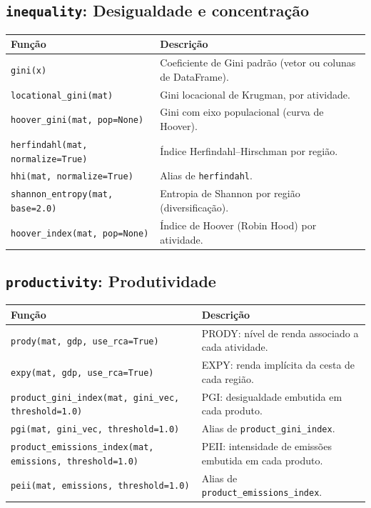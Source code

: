 \subsection{\texttt{inequality}: Desigualdade e concentra\c{c}\~{a}o}
\begin{longtable}{>{\raggedright\arraybackslash}p{9.2cm} >{\raggedright\arraybackslash}p{7.0cm}}
\toprule
\textbf{Fun\c{c}\~{a}o} & \textbf{Descri\c{c}\~{a}o} \\
\midrule\endhead
\texttt{\footnotesize gini(x)} & {\small Coeficiente de Gini padr\~{a}o (vetor ou colunas de DataFrame).} \\[2pt]
\texttt{\footnotesize locational\_gini(mat)} & {\small Gini locacional de Krugman, por atividade.} \\[2pt]
\texttt{\footnotesize hoover\_gini(mat, pop=None)} & {\small Gini com eixo populacional (curva de Hoover).} \\[2pt]
\texttt{\footnotesize herfindahl(mat, normalize=True)} & {\small \'{I}ndice Herfindahl--Hirschman por regi\~{a}o.} \\[2pt]
\texttt{\footnotesize hhi(mat, normalize=True)} & {\small Alias de \texttt{herfindahl}.} \\[2pt]
\texttt{\footnotesize shannon\_entropy(mat, base=2.0)} & {\small Entropia de Shannon por regi\~{a}o (diversifica\c{c}\~{a}o).} \\[2pt]
\texttt{\footnotesize hoover\_index(mat, pop=None)} & {\small \'{I}ndice de Hoover (Robin Hood) por atividade.} \\[2pt]
\bottomrule
\end{longtable}

\subsection{\texttt{productivity}: Produtividade}
\begin{longtable}{>{\raggedright\arraybackslash}p{9.2cm} >{\raggedright\arraybackslash}p{7.0cm}}
\toprule
\textbf{Fun\c{c}\~{a}o} & \textbf{Descri\c{c}\~{a}o} \\
\midrule\endhead
\texttt{\footnotesize prody(mat, gdp, use\_rca=True)} & {\small PRODY: n\'{i}vel de renda associado a cada atividade.} \\[2pt]
\texttt{\footnotesize expy(mat, gdp, use\_rca=True)} & {\small EXPY: renda impl\'{i}cita da cesta de cada regi\~{a}o.} \\[2pt]
\texttt{\footnotesize product\_gini\_index(mat, gini\_vec, threshold=1.0)} & {\small PGI: desigualdade embutida em cada produto.} \\[2pt]
\texttt{\footnotesize pgi(mat, gini\_vec, threshold=1.0)} & {\small Alias de \texttt{product\_gini\_index}.} \\[2pt]
\texttt{\footnotesize product\_emissions\_index(mat, emissions, threshold=1.0)} & {\small PEII: intensidade de emiss\~{o}es embutida em cada produto.} \\[2pt]
\texttt{\footnotesize peii(mat, emissions, threshold=1.0)} & {\small Alias de \texttt{product\_emissions\_index}.} \\[2pt]
\bottomrule
\end{longtable}

